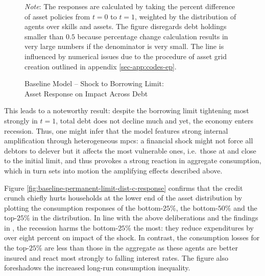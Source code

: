 \documentclass[a4paper,12pt]{article} %
\numberwithin{equation}{section} %
\numberwithin{figure}{section}
\numberwithin{table}{section}
\begin{document}
\begin{figure}[t]
    \centering
    \caption{Baseline Model -- Shock to Borrowing Limit: \\ Asset Response on Impact Across Debt}
    \label{fig:baseline-permanent-limit-dist-a-response}
    

    \vspace{10pt}
    
    \begin{minipage}{0.75\textwidth} 
    \footnotesize
    \textit{Note}: The responses are calculated by taking the percent difference of asset policies from $t=0$ to $t=1$, weighted by the distribution of agents over skills and assets. The figure disregards debt holdings smaller than $0.5$ because percentage change calculation results in very large numbers if the denominator is very small. The line is influenced by numerical issues due to the procedure of asset grid creation outlined in appendix \ref{sec-app:codes-ep}.
    \end{minipage}
\end{figure}

This leads to a noteworthy result: despite the borrowing limit tightening most strongly in $t=1$, total debt does not decline much and yet, the economy enters recession. Thus, one might infer that the model features strong internal amplification through heterogeneous \Gls{mpc}s: a financial shock might not force all debtors to delever but it affects the most vulnerable ones, i.e.~those at and close to the initial limit, and thus provokes a strong reaction in aggregate consumption, which in turn sets into motion the amplifying effects described above.

Figure \ref{fig:baseline-permanent-limit-dist-c-response} confirms that the credit crunch chiefly hurts households at the lower end of the asset distribution by plotting the consumption responses of the bottom-$25\%$, the bottom-$50\%$ and the top-$25\%$ in the distribution. In line with the above deliberations and the findings in \textcite{gl2017}, the recession harms the bottom-$25\%$ the most: they reduce expenditures by over eight percent on impact of the shock. In contrast, the consumption losses for the top-$25\%$ are less than those in the aggregate as these agents are better insured and react most strongly to falling interest rates. The figure also foreshadows the increased long-run consumption inequality.
\end{document}
